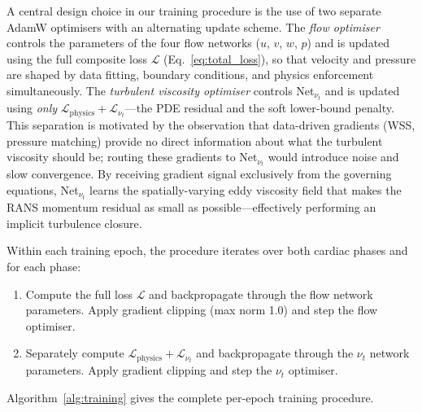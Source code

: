 \documentclass[11pt,a4paper]{article}
\begin{document}
A central design choice in our training procedure is the use of two separate AdamW optimisers with an alternating update scheme. The \emph{flow optimiser} controls the parameters of the four flow networks ($u$, $v$, $w$, $p$) and is updated using the full composite loss $\mathcal{L}$ (Eq.~\ref{eq:total_loss}), so that velocity and pressure are shaped by data fitting, boundary conditions, and physics enforcement simultaneously. The \emph{turbulent viscosity optimiser} controls Net$_{\nu_t}$ and is updated using \emph{only} $\mathcal{L}_{\text{physics}} + \mathcal{L}_{\nu_t}$---the PDE residual and the soft lower-bound penalty. This separation is motivated by the observation that data-driven gradients (WSS, pressure matching) provide no direct information about what the turbulent viscosity should be; routing these gradients to Net$_{\nu_t}$ would introduce noise and slow convergence. By receiving gradient signal exclusively from the governing equations, Net$_{\nu_t}$ learns the spatially-varying eddy viscosity field that makes the RANS momentum residual as small as possible---effectively performing an implicit turbulence closure.

Within each training epoch, the procedure iterates over both cardiac phases and for each phase:
\begin{enumerate}
\item Compute the full loss $\mathcal{L}$ and backpropagate through the flow network parameters. Apply gradient clipping (max norm 1.0) and step the flow optimiser.
\item Separately compute $\mathcal{L}_{\text{physics}} + \mathcal{L}_{\nu_t}$ and backpropagate through the $\nu_t$ network parameters. Apply gradient clipping and step the $\nu_t$ optimiser.
\end{enumerate}

Algorithm~\ref{alg:training} gives the complete per-epoch training procedure.
\end{document}
